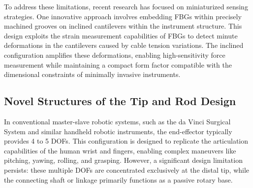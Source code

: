 To address these limitations, recent research has focused on miniaturized sensing strategies. One innovative approach involves embedding FBGs within precisely machined grooves on inclined cantilevers within the instrument structure\cite{xue_design_2018}. This design exploits the strain measurement capabilities of FBGs to detect minute deformations in the cantilevers caused by cable tension variations. The inclined configuration amplifies these deformations, enabling high-sensitivity force measurement while maintaining a compact form factor compatible with the dimensional constraints of minimally invasive instruments.

\subsection{Novel Structures of the Tip and Rod Design }

In conventional master-slave robotic systems, such as the da Vinci Surgical System and similar handheld robotic instruments, the end-effector typically provides 4 to 5 DOFs. This configuration is designed to replicate the articulation capabilities of the human wrist and fingers, enabling complex maneuvers like pitching, yawing, rolling, and grasping. However, a significant design limitation persists: these multiple DOFs are concentrated exclusively at the distal tip, while the connecting shaft or linkage primarily functions as a passive rotary base.

